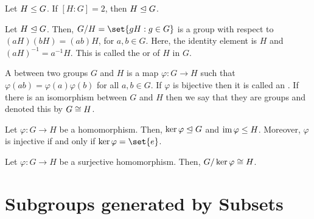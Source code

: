 \documentclass[11pt]{penrose}
\begin{document}
\begin{nthm}
    Let $H \mathrel{\leq} G$. If $[H:G] = 2$, then $H \mathrel{\trianglelefteq} G$.
\end{nthm}

\begin{nthm}
    Let $H \mathrel{\trianglelefteq} G$. Then, $G/H = \set{gH : g \in G}$ is a group with respect to $(aH)(bH) = (ab)H$, for $a, b \in G$. Here, the identity element is $H$ and $(aH)^{-1} = a^{-1} H$. This is called the  or  of $H$ in $G$.
\end{nthm}

\begin{ndfn}[Homomorphism]
    A  between two groups $G$ and $H$ is a map $\varphi : G \to H$ such that $\varphi(ab) = \varphi(a)\varphi(b)$ for all $a,b \in G$. If $\varphi$ is bijective then it is called an . If there is an isomorphism between $G$ and $H$ then we say that they are  groups and denoted this by $G \mathrel{\cong} H$.
\end{ndfn}

\begin{nthm}
    Let $\varphi : G \to H$ be a homomorphism. Then, $\ker\varphi \mathrel{\trianglelefteq} G$ and $\operatorname{im}\varphi \mathrel{\leq} H$. Moreover, $\varphi$ is injective if and only if $\ker\varphi = \set{e}$.
\end{nthm}

\begin{nthm}
    Let $\varphi : G \to H$ be a surjective homomorphism. Then, $G / \ker\varphi \mathrel{\cong} H$.
\end{nthm}

\section{Subgroups generated by Subsets}
\end{document}
